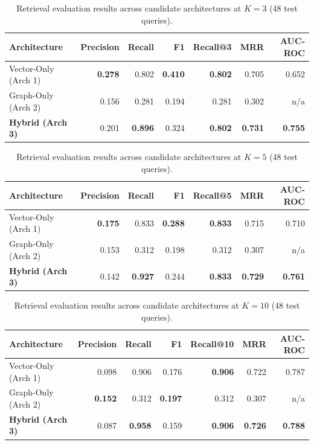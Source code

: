 \documentclass[11pt,a4paper]{article}
\begin{document}
\begin{table}[H]
\centering
\caption{Retrieval evaluation results across candidate architectures at $K=3$ (48 test queries).}
\begin{tabular}{lrrrrrr}
\toprule
\textbf{Architecture} & \textbf{Precision} & \textbf{Recall} & \textbf{F1} & \textbf{Recall@3} & \textbf{MRR} & \textbf{AUC-ROC} \\
\midrule
Vector-Only (Arch 1) & \textbf{0.278} & 0.802 & \textbf{0.410} & \textbf{0.802} & 0.705 & 0.652 \\
Graph-Only (Arch 2)  & 0.156 & 0.281 & 0.194 & 0.281 & 0.302 & n/a \\
\textbf{Hybrid (Arch 3)} & 0.201 & \textbf{0.896} & 0.324 & \textbf{0.802} & \textbf{0.731} & \textbf{0.755} \\
\bottomrule
\end{tabular}
\end{table}

\begin{table}[H]
\centering
\caption{Retrieval evaluation results across candidate architectures at $K=5$ (48 test queries).}
\begin{tabular}{lrrrrrr}
\toprule
\textbf{Architecture} & \textbf{Precision} & \textbf{Recall} & \textbf{F1} & \textbf{Recall@5} & \textbf{MRR} & \textbf{AUC-ROC} \\
\midrule
Vector-Only (Arch 1) & \textbf{0.175} & 0.833 & \textbf{0.288} & \textbf{0.833} & 0.715 & 0.710 \\
Graph-Only (Arch 2)  & 0.153 & 0.312 & 0.198 & 0.312 & 0.307 & n/a \\
\textbf{Hybrid (Arch 3)} & 0.142 & \textbf{0.927} & 0.244 & \textbf{0.833} & \textbf{0.729} & \textbf{0.761} \\
\bottomrule
\end{tabular}
\end{table}

\begin{table}[H]
\centering
\caption{Retrieval evaluation results across candidate architectures at $K=10$ (48 test queries).}
\begin{tabular}{lrrrrrr}
\toprule
\textbf{Architecture} & \textbf{Precision} & \textbf{Recall} & \textbf{F1} & \textbf{Recall@10} & \textbf{MRR} & \textbf{AUC-ROC} \\
\midrule
Vector-Only (Arch 1) & 0.098 & 0.906 & 0.176 & \textbf{0.906} & 0.722 & 0.787 \\
Graph-Only (Arch 2)  & \textbf{0.152} & 0.312 & \textbf{0.197} & 0.312 & 0.307 & n/a \\
\textbf{Hybrid (Arch 3)} & 0.087 & \textbf{0.958} & 0.159 & \textbf{0.906} & \textbf{0.726} & \textbf{0.788} \\
\bottomrule
\end{tabular}
\end{table}
\end{document}
